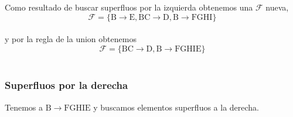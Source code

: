 \documentclass[10pt]{article}
\begin{document}
\noindent Como resultado de buscar superfluos por la izquierda obtenemos una $\mathcal{F}$ nueva,\\

$$\mathcal{F}=\mathrm{\{ B \rightarrow E, BC \rightarrow D, B \rightarrow FGHI \}}$$ \\ 
y por la regla de la union obtenemos $$\mathcal{F}=\mathrm{\{ BC \rightarrow D, B \rightarrow FGHIE \}}$$ \\

\subsubsection{Superfluos por la derecha}

Tenemos a $\mathrm{B \rightarrow FGHIE}$ y buscamos elementos superfluos a la derecha.\\
\end{document}
